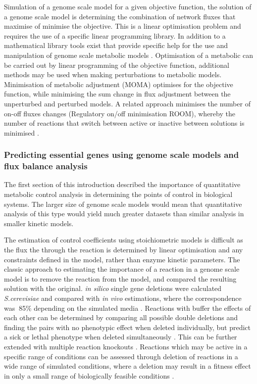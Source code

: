 
Simulation of a genome scale model for a given objective function, the solution of a genome scale model is determining the combination of network fluxes that maximise of minimise the objective. This is a linear optimisation problem and requires the use of a specific linear programming library. In addition to a mathematical library tools exist that provide specific help for the use and manipulation of genome scale metabolic models \cite{becker2007}. Optimisation of a metabolic can be carried out by linear programming of the objective function, additional methods may be used when making perturbations to metabolic models. Minimisation of metabolic adjustment (MOMA) \cite{segre2002,burgard2003} optimises for the objective function, while minimising the sum change in flux adjustment between the unperturbed and perturbed models. A related approach minimises the number of on-off fluxes changes (Regulatory on/off minimisation ROOM), whereby the number of reactions that switch between active or inactive between solutions is minimised \cite{shlomi2005}.


\subsubsection{Predicting essential genes using genome scale models and flux balance analysis}

The first section of this introduction described the importance of quantitative metabolic control analysis in determining the points of control in biological systems. The larger size of genome scale models would mean that quantitative analysis of this type would yield much greater datasets than similar analysis in smaller kinetic models.

The estimation of control coefficients using stoichiometric models is difficult as the flux the through the reaction is determined by linear optimisation and any constraints defined in the model, rather than enzyme kinetic parameters. The classic approach to estimating the importance of a reaction in a genome scale model is to remove the reaction from the model, and compared the resulting solution with the original. \emph{in silico} single gene deletions were calculated \emph{S.cerevisiae} and compared with \emph{in vivo} estimations, where the correspondence was $~$85\% depending on the simulated media \cite{famili2003,forster2003}. Reactions with buffer the effects of each other can be determined by comparing all possible double deletions and finding the pairs with no phenotypic effect when deleted individually, but predict a sick or lethal phenotype when deleted simultaneously \cite{harrison2007}. This can be further extended with multiple reaction knockouts \cite{deutscher2008}. Reactions which may be active in a specific range of conditions can be assessed through deletion of reactions in a wide range of simulated conditions, where a deletion may result in a fitness effect in only a small range of biologically feasible conditions \cite{papp2004}.

